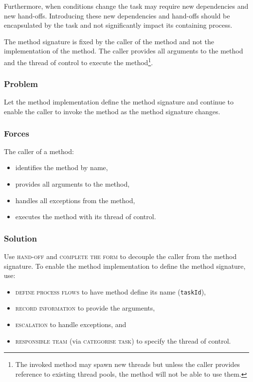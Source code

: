 \documentclass[prodmode]{style/acmlarge}
\begin{document}
Furthermore, when conditions change the task may require new dependencies and
new hand-offs.  Introducing these new dependencies and hand-offs should be
encapsulated by the task and not significantly impact its containing process.

The method signature is fixed by the caller of the method and not the
implementation of the method.  The caller provides all arguments to the method
and the thread of control to execute the method\footnote{The invoked method may
spawn new threads but unless the caller provides reference to existing thread
pools, the method will not be able to use them.}.

\subsubsection*{Problem} Let the method implementation define the method
signature and continue to enable the caller to invoke the method as the method
signature changes.

\subsubsection*{Forces} The caller of a method:
\begin{itemize}
  \item identifies the method by name,
  \item provides all arguments to the method,
  \item handles all exceptions from the method,
  \item executes the method with its thread of control.
\end{itemize}

\subsubsection*{Solution} Use \textsc{hand-off} and \textsc{complete the form}
to decouple the caller from the method signature.  To enable the method
implementation to define the method signature, use:
\begin{itemize}
  \item \textsc{define process flows} to have method define its name (\texttt{taskId}),
  \item \textsc{record information} to provide the arguments,
  \item \textsc{escalation} to handle exceptions, and
  \item \textsc{responsible team} (via \textsc{categorise task}) to specify the thread of control.    
\end{itemize}
\end{document}
